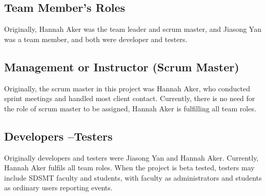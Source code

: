 \subsection{Team Member's Roles}
Originally, Hannah Aker was the team leader and scrum master, and Jiasong Yan was a team member, and both were developer and testers.
\subsection{Management or Instructor (Scrum Master)}
Originally, the scrum master in this project was Hannah Aker, who conducted sprint meetings and handled most client contact. Currently, there is no need for the role of scrum master to be assigned, Hannah Aker is fulfilling all team roles.
\subsection{Developers --Testers}
Originally developers and testers were Jiasong Yan and Hannah Aker. Currently, Hannah Aker fulfils all team roles. When the project is beta tested, testers may include SDSMT faculty and students, with faculty as administrators and students as ordinary users reporting events.
